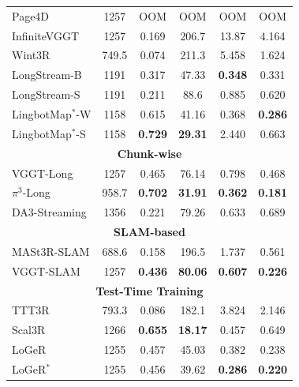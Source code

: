 \begin{table}[t]
{\begin{tabular}{l c >{\columncolor{subcol}}c >{\columncolor{subcol}}c >{\columncolor{subcol}}c >{\columncolor{subcol}}c}
 Page4D & 1257 & \cellcolor{oomred}OOM & \cellcolor{oomred}OOM & \cellcolor{oomred}OOM & \cellcolor{oomred}OOM \\
 InfiniteVGGT & 1257 & 0.169 & 206.7 & 13.87 & 4.164 \\
 Wint3R & 749.5 & 0.074 & 211.3 & 5.458 & 1.624 \\
 LongStream-B & 1191 & 0.317 & 47.33 & \cellcolor{secondorange}\textbf{0.348} & 0.331 \\
 LongStream-S & 1191 & 0.211 & 88.6 & 0.885 & 0.620 \\
 LingbotMap$^{*}$-W & 1158 & 0.615 & 41.16 & 0.368 & \textbf{0.286} \\
 LingbotMap$^{*}$-S & 1158 & \cellcolor{bestred}\textbf{0.729} & \cellcolor{secondorange}\textbf{29.31} & 2.440 & 0.663 \\
\midrule
\multicolumn{6}{c}{\cellcolor{catgray}\textbf{Chunk-wise}} \\
\midrule
 VGGT-Long & 1257 & 0.465 & 76.14 & 0.798 & 0.468 \\
 $\pi^{3}$-Long & 958.7 & \cellcolor{secondorange}\textbf{0.702} & \cellcolor{thirdyellow}\textbf{31.91} & \cellcolor{thirdyellow}\textbf{0.362} & \cellcolor{bestred}\textbf{0.181} \\
 DA3-Streaming & 1356 & 0.221 & 79.26 & 0.633 & 0.689 \\
\midrule
\multicolumn{6}{c}{\cellcolor{catgray}\textbf{SLAM-based}} \\
\midrule
 MASt3R-SLAM & 688.6 & 0.158 & 196.5 & 1.737 & 0.561 \\
 VGGT-SLAM & 1257 & \textbf{0.436} & \textbf{80.06} & \textbf{0.607} & \cellcolor{thirdyellow}\textbf{0.226} \\
\midrule
\multicolumn{6}{c}{\cellcolor{catgray}\textbf{Test-Time Training}} \\
\midrule
 TTT3R & 793.3 & 0.086 & 182.1 & 3.824 & 2.146 \\
 Scal3R & 1266 & \cellcolor{thirdyellow}\textbf{0.655} & \cellcolor{bestred}\textbf{18.17} & 0.457 & 0.649 \\
 LoGeR & 1255 & 0.457 & 45.03 & 0.382 & 0.238 \\
 LoGeR$^*$ & 1255 & 0.456 & 39.62 & \cellcolor{bestred}\textbf{0.286} & \cellcolor{secondorange}\textbf{0.220} \\
\bottomrule
\end{tabular}%
}
\end{table}
